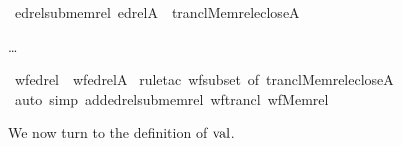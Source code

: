 \begin{isabelle}
\isamarkupfalse%
\ edrel{\isacharunderscore}sub{\isacharunderscore}memrel{\isacharcolon}\ {\isachardoublequoteopen}edrel{\isacharparenleft}A{\isacharparenright}\ {\isasymsubseteq}\ trancl{\isacharparenleft}Memrel{\isacharparenleft}eclose{\isacharparenleft}A{\isacharparenright}{\isacharparenright}{\isacharparenright}{\isachardoublequoteclose}
\end{isabelle}
\dots
\begin{isabelle}
\isamarkupfalse%
\ wf{\isacharunderscore}edrel\ {\isacharcolon}\ {\isachardoublequoteopen}wf{\isacharparenleft}edrel{\isacharparenleft}A{\isacharparenright}{\isacharparenright}{\isachardoublequoteclose}\isanewline
%
%
\isamarkupfalse%
\ {\isacharparenleft}rule{\isacharunderscore}tac\ wf{\isacharunderscore}subset\ {\isacharbrackleft}of\ {\isachardoublequoteopen}trancl{\isacharparenleft}Memrel{\isacharparenleft}eclose{\isacharparenleft}A{\isacharparenright}{\isacharparenright}{\isacharparenright}{\isachardoublequoteclose}{\isacharbrackright}{\isacharparenright}\isanewline
\ \ \isamarkupfalse%
\ {\isacharparenleft}auto\ simp\ add{\isacharcolon}edrel{\isacharunderscore}sub{\isacharunderscore}memrel\ wf{\isacharunderscore}trancl\ wf{\isacharunderscore}Memrel{\isacharparenright}\isanewline
\ \ \isamarkupfalse%
%
\end{isabelle}

We now turn to the definition of $\operatorname{val}$.

